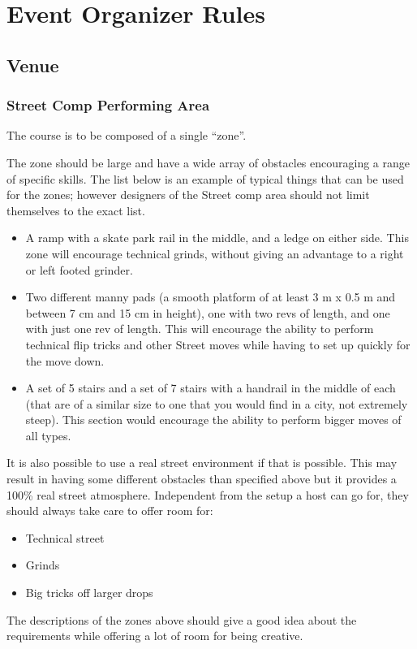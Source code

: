 \chapter{Event Organizer Rules}

\section{Venue}

\subsection{Street Comp Performing Area \label{sec:flat-street_street-performing-area}}
The course is to be composed of a single ``zone''.

The zone should be large and have a wide array of obstacles encouraging a range of specific skills.
The list below is an example of  typical things that can be used for the zones; however designers of the Street comp area should not limit themselves to the exact list.

\begin{itemize}
\item A ramp with a skate park rail in the middle, and a ledge on either side.
This zone will encourage technical grinds, without giving an advantage to a right or left footed grinder.
\item Two different manny pads (a smooth platform of at least 3 m x 0.5 m and between 7 cm and 15 cm in height), one with two revs of length, and one with just one rev of length.
This will encourage the ability to perform technical flip tricks and other Street moves while having to set up quickly for the move down.
\item A set of 5 stairs and a set of 7 stairs with a handrail in the middle of each (that are of a similar size to one that you would find in a city, not extremely steep).
This section would encourage the ability to perform bigger moves of all types.
\end{itemize}

It is also possible to use a real street environment if that is possible.
This may result in having some different obstacles than specified above but it provides a 100\% real street atmosphere.
Independent from the setup a host can go for, they should always take care to offer room for:
\begin{itemize}
\item Technical street
\item Grinds
\item Big tricks off larger drops
\end{itemize}
The descriptions of the zones above should give a good idea about the requirements while offering a lot of room for being creative.

